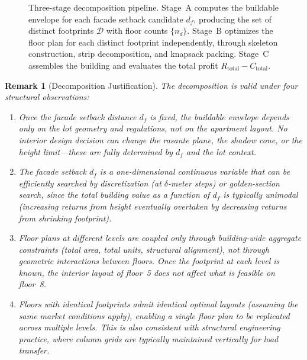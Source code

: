 \documentclass[11pt,a4paper]{article}
\newtheorem{remark}{Remark}
\begin{document}
\begin{figure}[ht]
\caption{Three-stage decomposition pipeline. Stage~A computes the
buildable envelope for each facade setback candidate $d_f$, producing
the set of distinct footprints $\mathcal{D}$ with floor counts $\{n_d\}$.
Stage~B optimizes the floor plan for each distinct footprint
independently, through skeleton construction, strip decomposition, and
knapsack packing. Stage~C assembles the building and evaluates the
total profit $R_{\text{total}} - C_{\text{total}}$.}
\label{fig:pipeline}
\end{figure}

\begin{remark}[Decomposition Justification]
The decomposition is valid under four structural observations:
\begin{enumerate}[label=(\alph*)]
    \item Once the facade setback distance $d_f$ is fixed, the
    buildable envelope depends only on the lot geometry and regulations,
    not on the apartment layout. No interior design decision can change
    the rasante plane, the shadow cone, or the height limit---these
    are fully determined by $d_f$ and the lot context.
    \item The facade setback $d_f$ is a one-dimensional continuous
    variable that can be efficiently searched by discretization (at
    $\delta$-meter steps) or golden-section search, since the
    total building value as a function of $d_f$ is typically unimodal
    (increasing returns from height eventually overtaken by decreasing
    returns from shrinking footprint).
    \item Floor plans at different levels are coupled only through
    building-wide aggregate constraints (total area, total units,
    structural alignment), not through geometric interactions between
    floors. Once the footprint at each level is known, the interior
    layout of floor~5 does not affect what is feasible on floor~8.
    \item Floors with identical footprints admit identical optimal
    layouts (assuming the same market conditions apply), enabling a
    single floor plan to be replicated across multiple levels. This
    is also consistent with structural engineering practice, where
    column grids are typically maintained vertically for load transfer.
\end{enumerate}
\end{remark}
\end{document}
